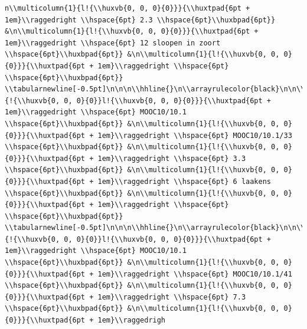 \documentclass[11pt,preprint, authoryear]{elsarticle}
\numberwithin{equation}{section}
\numberwithin{figure}{section}
\numberwithin{table}{section}
\begin{document}
\begin{verbatim}
n\\multicolumn{1}{l!{\\huxvb{0, 0, 0}{0}}}{\\huxtpad{6pt + 1em}\\raggedright \\hspace{6pt} 2.3 \\hspace{6pt}\\huxbpad{6pt}} &\n\\multicolumn{1}{l!{\\huxvb{0, 0, 0}{0}}}{\\huxtpad{6pt + 1em}\\raggedright \\hspace{6pt} 12 sloopen in zoort \\hspace{6pt}\\huxbpad{6pt}} &\n\\multicolumn{1}{l!{\\huxvb{0, 0, 0}{0}}}{\\huxtpad{6pt + 1em}\\raggedright \\hspace{6pt}  \\hspace{6pt}\\huxbpad{6pt}} \\tabularnewline[-0.5pt]\n\n\n\\hhline{}\n\\arrayrulecolor{black}\n\n\\multicolumn{1}{!{\\huxvb{0, 0, 0}{0}}l!{\\huxvb{0, 0, 0}{0}}}{\\huxtpad{6pt + 1em}\\raggedright \\hspace{6pt} MOOC10/10.1 \\hspace{6pt}\\huxbpad{6pt}} &\n\\multicolumn{1}{l!{\\huxvb{0, 0, 0}{0}}}{\\huxtpad{6pt + 1em}\\raggedright \\hspace{6pt} MOOC10/10.1/33 \\hspace{6pt}\\huxbpad{6pt}} &\n\\multicolumn{1}{l!{\\huxvb{0, 0, 0}{0}}}{\\huxtpad{6pt + 1em}\\raggedright \\hspace{6pt} 3.3 \\hspace{6pt}\\huxbpad{6pt}} &\n\\multicolumn{1}{l!{\\huxvb{0, 0, 0}{0}}}{\\huxtpad{6pt + 1em}\\raggedright \\hspace{6pt} 6 laakens \\hspace{6pt}\\huxbpad{6pt}} &\n\\multicolumn{1}{l!{\\huxvb{0, 0, 0}{0}}}{\\huxtpad{6pt + 1em}\\raggedright \\hspace{6pt}  \\hspace{6pt}\\huxbpad{6pt}} \\tabularnewline[-0.5pt]\n\n\n\\hhline{}\n\\arrayrulecolor{black}\n\n\\multicolumn{1}{!{\\huxvb{0, 0, 0}{0}}l!{\\huxvb{0, 0, 0}{0}}}{\\huxtpad{6pt + 1em}\\raggedright \\hspace{6pt} MOOC10/10.1 \\hspace{6pt}\\huxbpad{6pt}} &\n\\multicolumn{1}{l!{\\huxvb{0, 0, 0}{0}}}{\\huxtpad{6pt + 1em}\\raggedright \\hspace{6pt} MOOC10/10.1/41 \\hspace{6pt}\\huxbpad{6pt}} &\n\\multicolumn{1}{l!{\\huxvb{0, 0, 0}{0}}}{\\huxtpad{6pt + 1em}\\raggedright \\hspace{6pt} 7.3 \\hspace{6pt}\\huxbpad{6pt}} &\n\\multicolumn{1}{l!{\\huxvb{0, 0, 0}{0}}}{\\huxtpad{6pt + 1em}\\raggedrigh
\end{verbatim}
\end{document}
